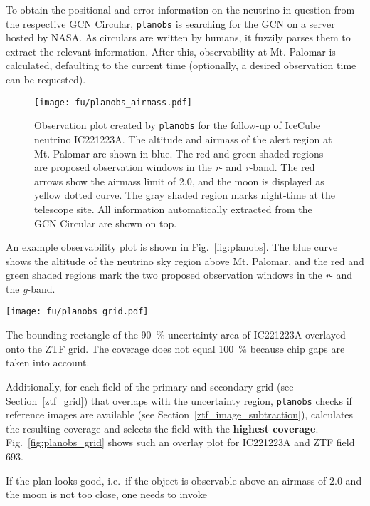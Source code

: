 To obtain the positional and error information on the neutrino in question from the respective GCN Circular, \texttt{planobs} is searching for the GCN on a server hosted by NASA. As circulars are written by humans, it fuzzily parses them to extract the relevant information. After this, observability at Mt. Palomar is calculated, defaulting to the current time (optionally, a desired observation time can be requested).

\begin{figure}[h!]
    \texttt{[image: fu/planobs\_airmass.pdf]}
    \caption[Observation plan]{Observation plot created by \texttt{planobs} for the follow-up of IceCube neutrino IC221223A. The altitude and airmass of the alert region at Mt. Palomar are shown in blue. The red and green shaded regions are proposed observation windows in the \textit{r}- and \textit{r}-band. The red arrows show the airmass limit of 2.0, and the moon is displayed as yellow dotted curve. The gray shaded region marks night-time at the telescope site. All information automatically extracted from the GCN Circular are shown on top.}
\end{figure}

An example observability plot is shown in Fig.~\ref{fig:planobs}. The blue curve shows the altitude of the neutrino sky region above Mt. Palomar, and the red and green shaded regions mark the two proposed observation windows in the \textit{r}- and the \textit{g}-band.

\begin{marginfigure}
    \texttt{[image: fu/planobs\_grid.pdf]}
    \caption[\texttt{planobs} ZTF grid]{The bounding rectangle of the \SI{90}{\percent} uncertainty area of IC221223A overlayed onto the ZTF grid. The coverage does not equal \SI{100}{\percent} because chip gaps are taken into account.}
\end{marginfigure}

Additionally, for each field of the primary and secondary grid (see Section~\ref{ztf_grid}) that overlaps with the uncertainty region, \texttt{planobs} checks if reference images are available (see Section~\ref{ztf_image_subtraction}), calculates the resulting coverage and selects the field with the \textbf{highest coverage}. Fig.~\ref{fig:planobs_grid} shows such an overlay plot for IC221223A and ZTF field 693.

If the plan looks good, i.e.\ if the object is observable above an airmass of 2.0 and the moon is not too close, one needs to invoke

